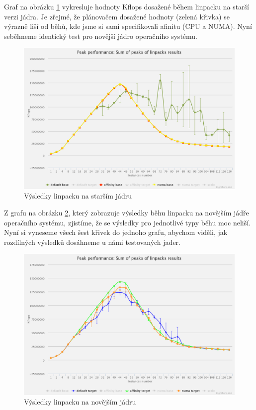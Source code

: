 \documentclass[
  master=true,
  font=sans,
  printversion=false,
  joinlists=true,
  figures=true,
  tables=true,
  sourcecodes=false,
  theorems=false,
  bibencoding=utf8,
  language=czech,
  encoding=utf8,
  field=ainfk,
  biblatex,
  glossaries,
  index
]{kidiplom}
\begin{document}
\newpage

Graf na obrázku \ref{older kernel linpack results} vykresluje hodnoty Kflops dosažené během linpacku na starší verzi jádra. Je zřejmé, že plánovačem dosažené hodnoty (zelená křivka) se výrazně liší od běhů, kde jsme si sami specifikovali afinitu (CPU a NUMA). Nyní seběhneme identický test pro novější jádro operačního systému.

\begin{figure}[ht]
\center
\includegraphics[scale=0.174]{obrazky/LinpackBaseChart.png}
\caption{Výsledky linpacku na starším jádru}
\label{older kernel linpack results}
\end{figure}

Z grafu na obrázku \ref{newer kernel linpack results}, který zobrazuje výsledky běhu linpacku na novějším jádře operačního systému,  zjistíme, že se výsledky pro jednotlivé typy běhu moc neliší. Nyní si vyneseme všech šest křivek do jednoho grafu, abychom viděli, jak rozdílných výsledků dosáhneme u námi testovaných jader. 

\begin{figure}[ht]
\center
\includegraphics[scale=0.174]{obrazky/LinpackTargetChart.png}
\caption{Výsledky linpacku na novějším jádru}
\label{newer kernel linpack results}
\end{figure}
\end{document}

